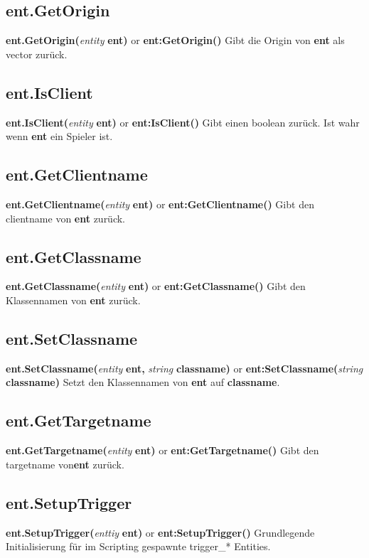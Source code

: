 \documentclass[11pt,a4paper]{book}
\begin{document}
\subsection{ent.GetOrigin}
\label{enty-getorigin}
\textbf{ent.GetOrigin(}\textit{entity}\textbf{ ent)} or \textbf{ent:GetOrigin()}
\newline
Gibt die Origin von \textbf{ent} als vector zurück.
\subsection{ent.IsClient}
\label{enty-isclient}
\textbf{ent.IsClient(}\textit{entity}\textbf{ ent)} or \textbf{ent:IsClient()}
\newline
Gibt einen boolean zurück. Ist wahr wenn \textbf{ent} ein Spieler ist.
\subsection{ent.GetClientname}
\label{enty-getclientname}
\textbf{ent.GetClientname(}\textit{entity}\textbf{ ent)} or \textbf{ent:GetClientname()}
\newline
Gibt den clientname von \textbf{ent} zurück.
\subsection{ent.GetClassname}
\label{enty-getclassname}
\textbf{ent.GetClassname(}\textit{entity}\textbf{ ent)} or \textbf{ent:GetClassname()}
\newline
Gibt den Klassennamen von \textbf{ent} zurück.
\subsection{ent.SetClassname}
\label{enty-setclassname}
\textbf{ent.SetClassname(}\textit{entity}\textbf{ ent, }\textit{string}\textbf{ classname)} or 
\newline
\textbf{ent:SetClassname(}\textit{string}\textbf{ classname)}
\newline
Setzt den Klassennamen von \textbf{ent} auf \textbf{classname}.
\subsection{ent.GetTargetname}
\label{enty-gettargetname}
\textbf{ent.GetTargetname(}\textit{entity}\textbf{ ent)} or \textbf{ent:GetTargetname()}
\newline
Gibt den targetname von\textbf{ent} zurück.
\subsection{ent.SetupTrigger}
\label{enty-setuptrigger}
\textbf{ent.SetupTrigger(}\textit{enttiy}\textbf{ ent)} or \textbf{ent:SetupTrigger()}
\newline
Grundlegende Initialisierung für im Scripting gespawnte trigger\_* Entities.
\end{document}
